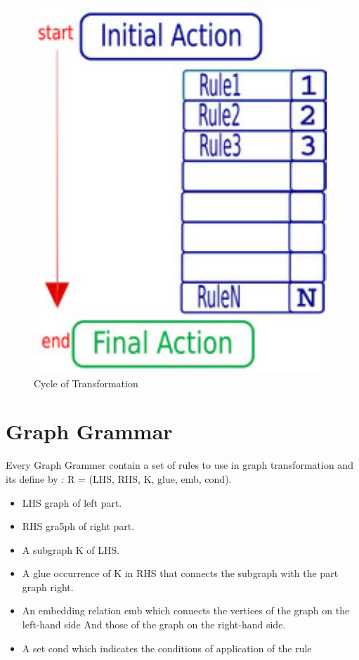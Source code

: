 \begin{figure}[th]
	\centering
		\includegraphics[scale=0.8]{Chapiter3/img/gt}
	\caption{\label{fig:Cycle of Tranformation}Cycle of Transformation}
\end{figure} 

 
\section{Graph Grammar} 
Every Graph Grammer contain a set of rules  to use in graph transformation
and its define by :
R = (LHS, RHS, K, glue, emb, cond). 
\begin{itemize}
 
\item LHS graph of left part.
\item RHS gra5ph of right part.
\item A subgraph K of LHS.
\item A glue occurrence of K in RHS that connects the subgraph with the part graph  right.
\item An embedding relation emb which connects the vertices of the graph on the left-hand side
And those of the graph on the right-hand side.
\item A set cond which indicates the conditions of application of the rule
\end{itemize}

